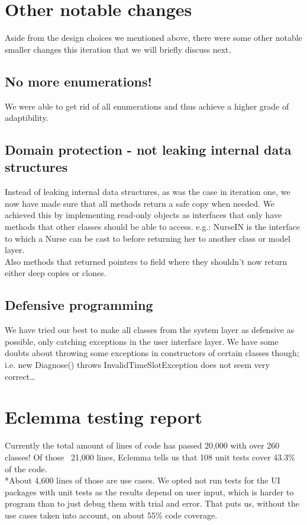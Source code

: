 \documentclass[11pt]{article}
\begin{document}
\section{Other notable changes}
Aside from the design choices we mentioned above, there were some other notable smaller changes this iteration that we will briefly discuss next.

\subsection{No more enumerations!}
We were able to get rid of all enumerations and thus achieve a higher grade of adaptibility.

\subsection{Domain protection - not leaking internal data structures}
Instead of leaking internal data structures, as was the case in iteration one, we now have made sure that all methods return a safe copy when needed. We achieved this by implementing read-only objects as interfaces that only have methods that other classes should be able to access. e.g.: NurseIN is the interface to which a Nurse can be cast to before returning her to another class or model layer.
\\Also methods that returned pointers to field where they shouldn't now return either deep copies or clones.

\subsection{Defensive programming}
We have tried our best to make all classes from the system layer as defensive as possible, only catching exceptions in the user interface layer. We have some doubts about throwing some exceptions in constructors of certain classes though; i.e. new Diagnose() throws InvalidTimeSlotException does not seem very correct\dots

\section{Eclemma testing report}
Currently the total amount of lines of code has passed 20,000 with over 260 classes! Of those ~21,000 lines, Eclemma tells us that 108 unit tests cover 43.3\% of the code. 
\\*About 4,600 lines of those are use cases. We opted not run tests for the UI packages with unit tests as the results depend on user input, which is harder to program than to just debug them with trial and error. That puts us, without the use cases taken into account, on about 55\% code coverage.
\end{document}
